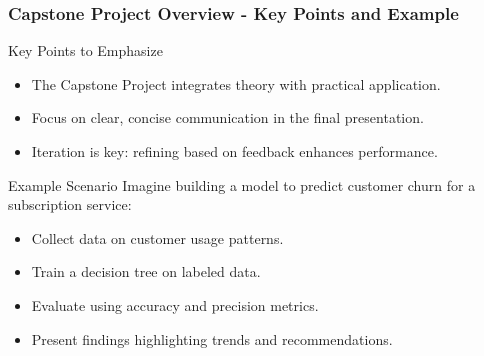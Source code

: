 \documentclass[aspectratio=169]{beamer}
\begin{document}
\begin{frame}[fragile]
  \frametitle{Capstone Project Overview - Key Points and Example}
  
  \begin{block}{Key Points to Emphasize}
    \begin{itemize}
        \item The Capstone Project integrates theory with practical application.
        \item Focus on clear, concise communication in the final presentation.
        \item Iteration is key: refining based on feedback enhances performance.
    \end{itemize}
  \end{block}

  \begin{block}{Example Scenario}
    Imagine building a model to predict customer churn for a subscription service:
    \begin{itemize}
        \item Collect data on customer usage patterns.
        \item Train a decision tree on labeled data.
        \item Evaluate using accuracy and precision metrics.
        \item Present findings highlighting trends and recommendations.
    \end{itemize}
  \end{block}
\end{frame}
\end{document}
